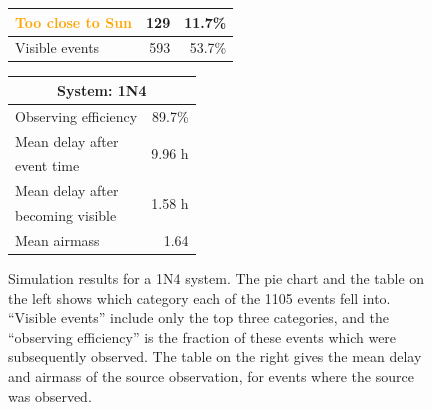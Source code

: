 \begin{colsection}
\begin{figure}[p]
\begin{center}
\begin{minipage}[t]{0.45\linewidth}
\begin{tabular}{lrr}
                \textcolor{Orange}{Too close to Sun} & 129 & 11.7\% \\
                \midrule
                Visible events & 593 &  53.7\% \\
            \end{tabular}
        \end{minipage}
        \begin{minipage}[t]{0.37\linewidth}\vspace{0pt}
            \begin{tabular}{lr}
                \multicolumn{2}{c}{\textbf{System: 1N4}} \\
                \midrule
                Observing efficiency & 89.7\% \\
                \midrule
                Mean delay after     & \multirow{2}{*}{9.96 h} \\
                event time           & \\
                Mean delay after     & \multirow{2}{*}{1.58 h} \\
                becoming visible     & \\
                \midrule
                Mean airmass         & 1.64 \\
            \end{tabular}
        \end{minipage}
    \end{center}
    \caption[GW simulation results: 1N4 system]{
        Simulation results for a 1N4 system. The pie chart and the table on the left shows which category each of the 1105 events fell into. ``Visible events'' include only the top three categories, and the ``observing efficiency'' is the fraction of these events which were subsequently observed. The table on the right gives the mean delay and airmass of the source observation, for events where the source was observed.
    }\label{fig:gw_sim_1n4}
\end{figure}


\end{colsection}
